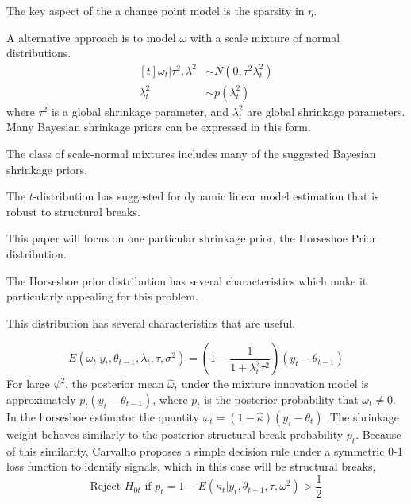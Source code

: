 \documentclass{article}
\begin{document}
The key aspect of the a change point model is the sparsity in $\eta$.

A alternative approach is to model $\omega$ with a scale mixture of normal distributions.
\begin{equation}
  \label{eq:6}
  \begin{aligned}[t]
    \omega_{t} | \tau^{2}, \lambda^{2} & \sim N(0, \tau^{2} \lambda_{t}^{2}) \\
    \lambda_{t}^{2} & \sim p(\lambda^{2}_{t})
  \end{aligned}
\end{equation}
where $\tau^{2}$ is a global shrinkage parameter, and $\lambda_{t}^{2}$ are global shrinkage parameters.
Many Bayesian shrinkage priors can be expressed in this form. 

The class of scale-normal mixtures includes many of the suggested Bayesian shrinkage priors.

The $t$-distribution has suggested for dynamic linear model estimation that is robust to structural breaks.

This paper will focus on one particular shrinkage prior, the Horseshoe Prior distribution.

The Horseshoe prior distribution has several characteristics which make it particularly appealing for this problem.

This distribution has several characteristics that are useful.

\begin{equation}
  \label{eq:10}
  E(\omega_{t} | y_{t}, \theta_{t-1}, \lambda_{t}, \tau, \sigma^{2}) =
  \left(
    1 - \frac{1}{1 + \lambda_{t}^{2} \tau^{2}}
  \right) (y_{t} - \theta_{t - 1})
\end{equation}
For large $\psi^{2}$, the posterior mean $\hat\omega_{t}$ under the mixture innovation model is 
approximately $p_{t} (y_{t} - \theta_{t-1})$, where $p_{t}$ is the posterior probability that $\omega_{t} \neq 0$.
In the horseshoe estimator the quantity $\hat \omega_{t} = (1 - \hat \kappa) (y_{i} - \theta_{t})$.
The shrinkage weight behaves similarly to the posterior structural break probability $p_{t}$.
Because of this similarity, Carvalho proposes a simple decision rule under a symmetric 0-1 loss function
to identify signals, which in this case will be structural breaks,
\begin{equation}
  \label{eq:11}
  \text{Reject $H_{0t}$ if $p_{t} = 1 - E(\kappa_{t} | y_{t}, \theta_{t-1}, \tau, \omega^{2})$} > \frac{1}{2}
\end{equation}
\end{document}
